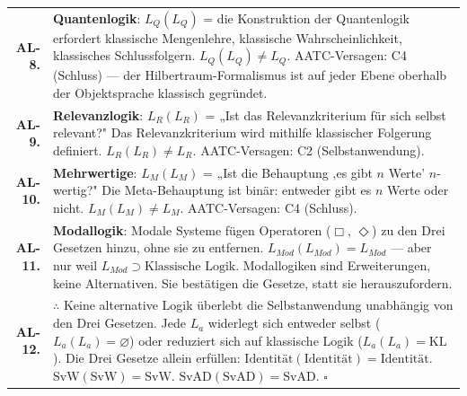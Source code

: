 \documentclass[10pt, openany, oneside]{book}
\begin{document}
{\begin{tabular}{r p{}}
\textbf{AL-8.} & \textbf{Quantenlogik}: $L_Q(L_Q)$ = die Konstruktion der Quantenlogik erfordert klassische Mengenlehre, klassische Wahrscheinlichkeit, klassisches Schlussfolgern. $L_Q(L_Q) \neq L_Q$. AATC-Versagen: C4 (Schluss) --- der Hilbertraum-Formalismus ist auf jeder Ebene oberhalb der Objektsprache klassisch gegründet. \\[0.3em]
\textbf{AL-9.} & \textbf{Relevanzlogik}: $L_R(L_R)$ = „Ist das Relevanzkriterium für sich selbst relevant?" Das Relevanzkriterium wird mithilfe klassischer Folgerung definiert. $L_R(L_R) \neq L_R$. AATC-Versagen: C2 (Selbstanwendung). \\[0.3em]
\textbf{AL-10.} & \textbf{Mehrwertige}: $L_M(L_M)$ = „Ist die Behauptung ‚es gibt $n$ Werte' $n$-wertig?" Die Meta-Behauptung ist binär: entweder gibt es $n$ Werte oder nicht. $L_M(L_M) \neq L_M$. AATC-Versagen: C4 (Schluss). \\[0.3em]
\textbf{AL-11.} & \textbf{Modallogik}: Modale Systeme fügen Operatoren ($\Box$, $\Diamond$) zu den Drei Gesetzen hinzu, ohne sie zu entfernen. $L_{Mod}(L_{Mod}) = L_{Mod}$ --- aber nur weil $L_{Mod} \supset \text{Klassische Logik}$. Modallogiken sind Erweiterungen, keine Alternativen. Sie bestätigen die Gesetze, statt sie herauszufordern. \\[0.3em]
\textbf{AL-12.} & $\therefore$ Keine alternative Logik überlebt die Selbstanwendung unabhängig von den Drei Gesetzen. Jede $L_a$ widerlegt sich entweder selbst ($L_a(L_a) = \varnothing$) oder reduziert sich auf klassische Logik ($L_a(L_a) = \text{KL}$). Die Drei Gesetze allein erfüllen: $\text{Identität}(\text{Identität}) = \text{Identität}$. $\text{SvW}(\text{SvW}) = \text{SvW}$. $\text{SvAD}(\text{SvAD}) = \text{SvAD}$. $\square$ \\[0.3em]
\end{tabular}
}

\vspace{0.8em}
\end{document}
